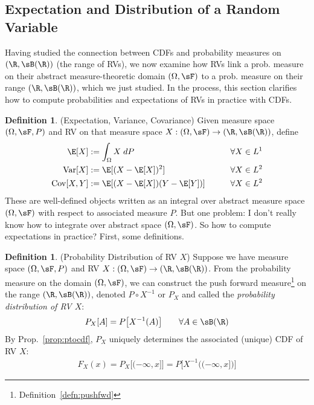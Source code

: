 \documentclass[12pt]{article}
\theoremstyle{plain}
\theoremstyle{definition}
\newtheorem{defn}[thm]{Definition}
\theoremstyle{remark}
\newcommand{\ra}{\rightarrow}
\newcommand{\Cov}{\operatorname{Cov}}
\newcommand{\Var}{\operatorname{Var}}
\begin{document}
\clearpage
\subsection{Expectation and Distribution of a Random Variable}

Having studied the connection between CDFs and probability measures on
$(\R,\sB(\R))$ (the range of RVs), we now examine how RVs link a
prob. measure on their abstract measure-theoretic domain $(\Omega,\sF)$
to a prob.  measure on their range $(\R,\sB(\R))$, which we just
studied.
In the process, this section clarifies how to compute probabilities and
expectations of RVs in practice with CDFs.

\begin{defn}(Expectation, Variance, Covariance)
\label{defn:exp}
Given measure space $(\Omega,\sF,P)$ and RV on that measure space
$X:(\Omega,\sF)\ra (\R,\sB(\R))$, define
\begin{alignat*}{3}
  \E[X] &:= \int_\Omega X \; dP &&\forall X\in L^1\\
  \Var[X] &:= \E[(X-\E[X])^2]  &&\forall X\in L^2\\
  \Cov[X,Y] &:= \E[(X-\E[X])(Y-\E[Y])] \qquad&&\forall X\in L^2
\end{alignat*}
These are well-defined objects written as an integral over abstract
measure space $(\Omega,\sF)$ with respect to associated measure $P$.
But one problem: I don't really know how to integrate over
abstract space $(\Omega,\sF)$.
So how to compute expectations in practice?
First, some definitions.
\end{defn}

\begin{defn}(Probability Distribution of RV $X$)
\label{defn:probdist}
Suppose we have measure space $(\Omega,\sF,P)$ and RV
$X:(\Omega,\sF)\ra (\R,\sB(\R))$. From the probability measure on the
domain $(\Omega,\sF)$, we can construct the push forward
measure\footnote{%
  Definition~\ref{defn:pushfwd}
}
on the range $(\R,\sB(\R))$, denoted $P \circ X^{-1}$ or $P_X$ and
called the \emph{probability distribution of RV $X$}:
\begin{align*}
  P_X[A] =
  P\big[ X^{-1}(A) \big]
  \qquad \forall A\in\sB(\R)
\end{align*}
By Prop.~\ref{prop:ptocdf}, $P_X$ uniquely determines the associated
(unique) CDF of RV $X$:
\begin{align*}
  F_X(x)
  = P_X\big[(-\infty,x]\big]
  = P\big[X^{-1}\big((-\infty,x]\big)\big]
\end{align*}
\end{defn}
\end{document}
